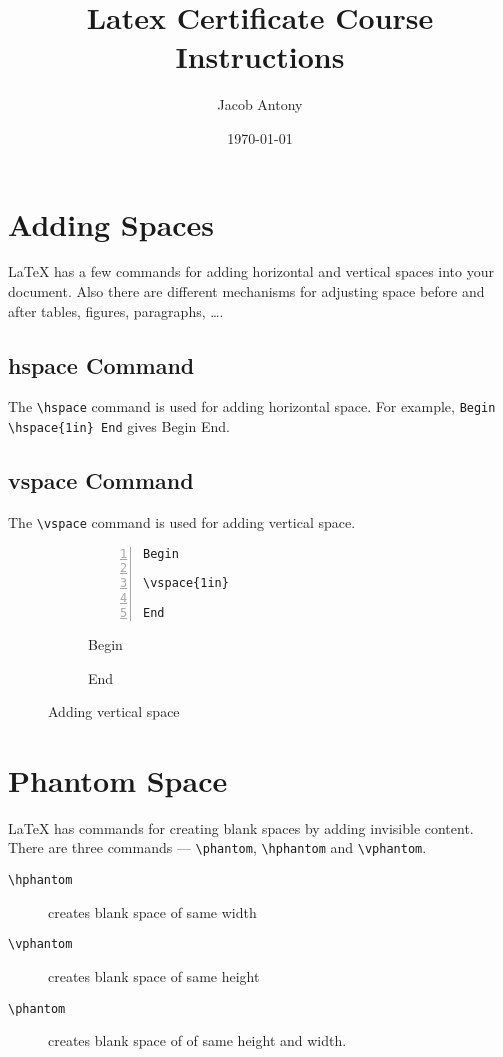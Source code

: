 \documentclass{article}
\title{Latex Certificate Course Instructions}
\author{Jacob Antony}
\date{\today}
\theoremstyle{definition}
\theoremstyle{remark}
\begin{document}
\maketitle

\section{Adding Spaces}
	\LaTeX{} has a few commands for adding horizontal and vertical spaces into your document. Also there are different mechanisms for adjusting space before and after tables, figures, paragraphs, \dots.

\subsection{hspace Command}
	The \texttt{\textbackslash hspace} command is used for adding horizontal space. For example, \texttt{Begin \textbackslash hspace\{1in\} End} gives Begin \hspace{1in} End.

\subsection{vspace Command}
	The \texttt{\textbackslash vspace} command is used for adding vertical space.
\begin{figure}[h]
\centering
\begin{subfigure}{0.45\textwidth}
\begin{Verbatim}[numbers = left]
Begin

\vspace{1in}

End
\end{Verbatim}
\end{subfigure}
\begin{subfigure}{0.45\textwidth}
Begin

\vspace{1in}

End
\end{subfigure} 
\caption{Adding vertical space}
\label{fig:vspace}
\end{figure}

\section{Phantom Space}
	\LaTeX{} has commands for creating blank spaces by adding invisible content. There are three commands --- \texttt{\textbackslash phantom}, \texttt{\textbackslash hphantom} and \texttt{\textbackslash vphantom}.
\begin{description}
\item[\texttt{\textbackslash hphantom}] creates blank space of same width
\item[\texttt{\textbackslash vphantom}] creates blank space of same height
\item[\texttt{\textbackslash phantom}] creates blank space of of same height and width.
\end{description}
\end{document}
